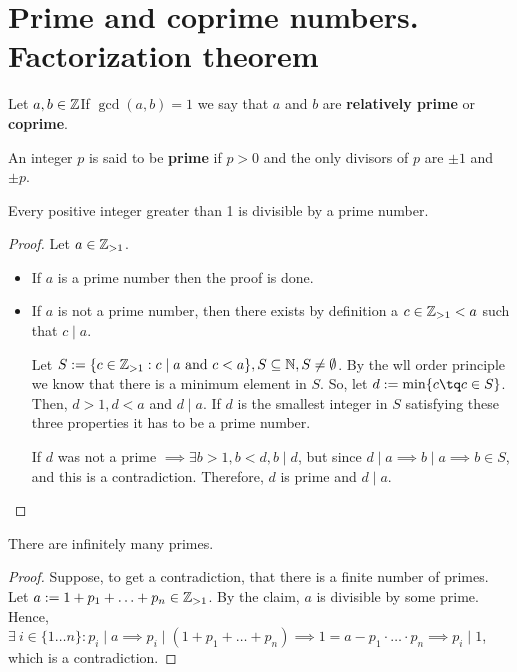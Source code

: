 \section{Prime and coprime numbers. Factorization theorem}
\begin{defi}[Coprimes]
    Let $a, b\in\mathbb{Z}$If $\gcd\left( a, b \right) = 1$ we say that $a$ and $b$ are
    \textbf{relatively prime} or \textbf{coprime}.
\end{defi}

\begin{defi}
    An integer $p$ is said to be \textbf{prime} if $p > 0$ and the only divisors
    of $p$ are $\pm 1$ and $\pm p$.
\end{defi}

\begin{prop}
    Every positive integer greater than 1 is divisible by a prime number.
\end{prop}

\begin{proof}
    Let $a\in\mathbb{Z}_{>1}$.
    \begin{itemize}[itemsep = -2pt]
        \item If $a$ is a prime number then the proof is done.
        \item If $a$ is not a prime number, then there exists by definition a $c\in\mathbb{Z}_{>1} < a$ such
        that $c\mid a$.

        Let $S:=\{c\in\mathbb{Z}_{>1} : c\mid a \textrm{ and } c < a\}, S\subseteq\mathbb{N}, S\neq\emptyset$. By the wll order
        principle we know that there is a minimum element in $S$. So, let $d:=\min \{c\tq c\in S\} $. Then,
        $d > 1, d < a$ and $d\mid a$. If $d$ is the smallest integer in $S$ satisfying these three properties
        it has to be a prime number.

        If $d$ was not a prime $\implies\exists b > 1, b < d, b\mid d$, but since $d\mid a\implies b\mid a
        \implies b\in S$, and this is a contradiction. Therefore, $d$ is prime and $d\mid a$.
    \end{itemize}
\end{proof}

\begin{theorem}
    There are infinitely many primes.
\end{theorem}

\begin{proof}
    Suppose, to get a contradiction, that there is a finite number of primes. Let $a:= 1 + p_1 + \ldots +
    p_n\in\mathbb{Z}_{>1}$. By the claim, $a$ is divisible by some prime. Hence, $\exists\ i\in \{1\ldots n\} :
    p_i\mid a\implies p_i\mid\left( 1 + p_1 + \ldots + p_n \right)\implies 1 = a - p_1\cdot\ldots\cdot p_n
    \implies p_i\mid 1$, which is a contradiction.
\end{proof}

